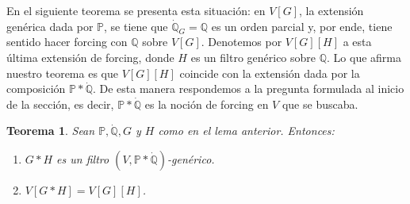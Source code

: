 \documentclass[11pt]{unam_tesis1}
\theoremstyle{MyThmStyle}
\theoremstyle{definition}
\theoremstyle{plain}
\newtheorem{theorem}[definition]{Teorema}
\theoremstyle{remark}
\begin{document}
En el siguiente teorema se presenta esta situaci\'on: en $V[G]$, la extensi\'on gen\'erica dada por $\mathbb P$, se tiene que $\dot{\mathbb Q}_G=\mathbb Q$ es un orden parcial y, por ende, tiene sentido hacer forcing con $\mathbb Q$ sobre $V[G]$. Denotemos por $V[G][H]$ a esta \'ultima extensi\'on de forcing, donde $H$ es un filtro gen\'erico sobre $\mathbb Q$. Lo que afirma nuestro teorema es que $V[G][H]$ coincide con la extensi\'on dada por la composici\'on $\mathbb P*\dot{\mathbb Q}$. De esta manera respondemos a la pregunta formulada al inicio de la secci\'on, es decir, $\mathbb P*\dot{\mathbb Q}$ es la noci\'on de forcing en $V$ que se buscaba.

\begin{theorem}\label{iteraciondos}
Sean $\mathbb P,\dot{\mathbb Q},G$ y $H$ como en el lema anterior. Entonces:

\begin{enumerate}
\item $G*H$ es un filtro $(V,\mathbb P*\dot{\mathbb Q})$-gen\'erico.
\item $V[G*H]=V[G][H]$.
\end{enumerate}
\end{theorem}
\end{document}
